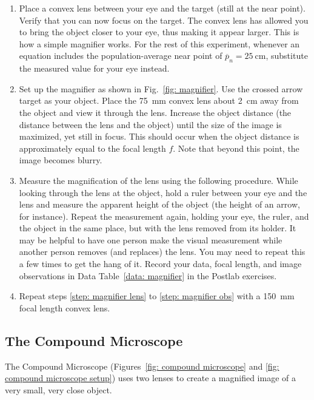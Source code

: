 \documentclass[addpoints]{physlabs}
\begin{document}
\begin{labsection}
\begin{enumerate}
        \item Place a convex lens between your eye and the target (still at the near point). Verify that you can now focus on the target. The convex lens has allowed you to bring the object closer to your eye, thus making it appear larger. This is how a simple magnifier works. For the rest of this experiment, whenever an equation includes the population-average near point of $\overline{p}_n=\qty{25}{\centi\meter}$, substitute the measured value for your eye instead. \label{step: magnifier lens}

        \item Set up the magnifier as shown in Fig.~\ref{fig: magnifier}. Use the crossed arrow target as your object. Place the \qty{75}{\milli\meter} convex lens about \qty{2}{\centi\meter} away from the object and view it through the lens. Increase the object distance (the distance between the lens and the object) until the size of the image is maximized, yet still in focus. This should occur when the object distance is approximately equal to the focal length $f$. Note that beyond this point, the image becomes blurry. \label{step: magnifier distance}

        \item Measure the magnification of the lens using the following procedure. While looking through the lens at the object, hold a ruler between your eye and the lens and measure the apparent height of the object (the height of an arrow, for instance). Repeat the measurement again, holding your eye, the ruler, and the object in the same place, but with the lens removed from its holder. It may be helpful to have one person make the visual measurement while another person removes (and replaces) the lens. You may need to repeat this a few times to get the hang of it. Record your data, focal length, and image observations in Data Table~\ref{data: magnifier} in the Postlab exercises. \label{step: magnifier obs}

        \item Repeat steps \ref{step: magnifier lens} to \ref{step: magnifier obs} with a \qty{150}{\milli\meter} focal length convex lens.
    \end{enumerate}

    \subsection*{The Compound Microscope}

    The Compound Microscope (Figures~\ref{fig: compound microscope} and \ref{fig: compound microscope setup}) uses two lenses to create a magnified image of a very small, very close object.
    

\end{labsection}
\end{document}
